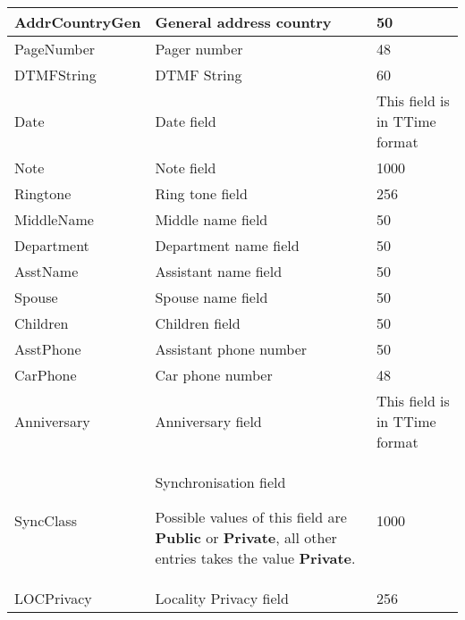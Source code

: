 \begin{table}[htbp]
\begin{center}
\begin{tabular}{l|l|l}
\hline
AddrCountryGen & General address country & 50  \\
\hline
PageNumber & Pager number & 48  \\
\hline
DTMFString & DTMF String & 60  \\
\hline
Date & Date field & This field is in TTime format  \\
\hline
Note & Note field & 1000  \\
\hline
Ringtone & Ring tone field & 256  \\
\hline
{\color{blue}MiddleName} & {\color{blue}Middle name field} & 50  \\
\hline
{\color{blue}Department} & {\color{blue}Department name field} & 50  \\
\hline
{\color{blue}AsstName} & {\color{blue}Assistant name field} & 50  \\
\hline
{\color{blue}Spouse} & {\color{blue}Spouse name field} & 50  \\
\hline
{\color{blue}Children} & {\color{blue}Children field} & 50  \\
\hline
{\color{blue}AsstPhone} & {\color{blue}Assistant phone number} & 50 \\
\hline
{\color{blue}CarPhone} & {\color{blue}Car phone number} & 48  \\
\hline
{\color{blue}Anniversary} & {\color{blue}Anniversary field} & This field is in TTime format  \\
\hline
{\color{blue}SyncClass} & {\color{blue}Synchronisation field} \break

{\color{blue}Possible values of this field are {\bf Public} or {\bf Private}, all other entries takes the value {\bf Private}.} & 1000  \\
\hline
LOCPrivacy & Locality Privacy field & 256  \\
\end{tabular}
\end{center}
\end{table}























 


